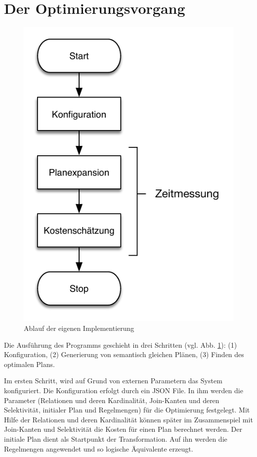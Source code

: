 \section{Der Optimierungsvorgang}

\begin{figure}[h]
  \centering
  \includegraphics{04_Implementierung/00_media/Ablauf.pdf}
  \caption{Ablauf der eigenen Implementierung}
  \label{Ablauf}
\end{figure}

Die Ausführung des Programms geschieht in drei Schritten (vgl. Abb. \ref{Ablauf}): (1) Konfiguration, (2) Generierung von semantisch gleichen Plänen, (3) Finden des optimalen Plans.




Im ersten Schritt, wird auf Grund von externen Parametern das System konfiguriert. Die Konfiguration erfolgt durch ein JSON File. In ihm werden die Parameter (Relationen und deren Kardinalität, Join-Kanten und deren Selektivität, initialer Plan und Regelmengen) für die Optimierung festgelegt. Mit Hilfe der Relationen und deren Kardinalität können später im Zusammenspiel mit Join-Kanten und Selektivität die Kosten für einen Plan berechnet werden. Der initiale Plan dient als Startpunkt der Transformation. Auf ihn werden die Regelmengen angewendet und so logische  Äquivalente erzeugt.

